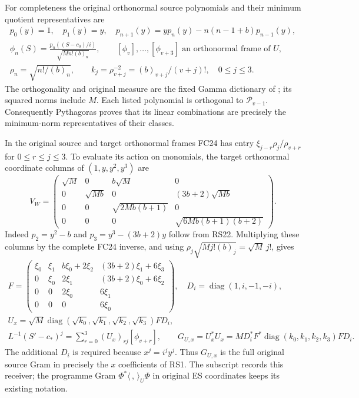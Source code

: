 \documentclass[11pt]{article}
\newcommand{\diag}{\operatorname{diag}}
\begin{document}
For completeness the original orthonormal source polynomials
and their minimum quotient representatives are
\begin{equation}
 \begin{gathered}
 p_0(y)=1,\quad p_1(y)=y,\quad
 p_{n+1}(y)=yp_n(y)-n(n-1+b)p_{n-1}(y),\\
 \phi_n(S)=\frac{p_n((S-c_0)/i)}{\sqrt{Mn!(b)_n}},\qquad
 [\phi_v],\ldots,[\phi_{v+3}]\text{ an orthonormal frame of }U,\\
 \rho_n=\sqrt{n!/(b)_n},\qquad
 k_j=\rho_{v+j}^{-2}=(b)_{v+j}/(v+j)!,\quad0\le j\le3.
 \end{gathered}
 \tag{RS22}
\end{equation}
The orthogonality and original measure are the fixed Gamma
dictionary of \cite{WCF,DLMF18Source}; its squared norms include $M$.
Each listed polynomial is orthogonal to $\mathcal P_{v-1}$.
Consequently Pythagoras proves that its linear combinations
are precisely the minimum-norm representatives of their classes.

In the original source and target orthonormal frames FC24 has
entry $\xi_{j-r}\rho_j/\rho_{v+r}$ for $0\le r\le j\le3$.
To evaluate its action on monomials, the target orthonormal
coordinate columns of $(1,y,y^2,y^3)$ are
\begin{equation}
 V_W=\begin{pmatrix}
 \sqrt M&0&b\sqrt M&0\\
 0&\sqrt{Mb}&0&(3b+2)\sqrt{Mb}\\
 0&0&\sqrt{2Mb(b+1)}&0\\
 0&0&0&\sqrt{6Mb(b+1)(b+2)}
 \end{pmatrix}.
 \tag{RS23}
\end{equation}
Indeed $p_2=y^2-b$ and $p_3=y^3-(3b+2)y$ follow
from RS22. Multiplying these columns by the complete FC24
inverse, and using
$\rho_j\sqrt{Mj!(b)_j}=\sqrt M\,j!$, gives
\begin{equation}
 \begin{gathered}
 F=\begin{pmatrix}
 \xi_0&\xi_1&b\xi_0+2\xi_2&(3b+2)\xi_1+6\xi_3\\
 0&\xi_0&2\xi_1&(3b+2)\xi_0+6\xi_2\\
 0&0&2\xi_0&6\xi_1\\0&0&0&6\xi_0
 \end{pmatrix},\quad D_i=\diag(1,i,-1,-i),\\
 U_x=\sqrt M\diag(\sqrt{k_0},\sqrt{k_1},\sqrt{k_2},\sqrt{k_3})FD_i,\\
 L^{-1}(S'-c_*)^j=\sum_{r=0}^3(U_x)_{rj}[\phi_{v+r}],\qquad
 G_{U,x}=U_x^*U_x=M D_i^*F^*\diag(k_0,k_1,k_2,k_3)FD_i.
 \end{gathered}
 \tag{RS24}
\end{equation}
The additional $D_i$ is required because $x^j=i^jy^j$.
Thus $G_{U,x}$ is the full original source Gram in precisely
the $x$ coefficients of RS1. The subscript records this receiver;
the programme Gram $\Phi^*\langle\, ,\,\rangle_U\Phi$ in
original ES coordinates keeps its existing notation.
\end{document}
